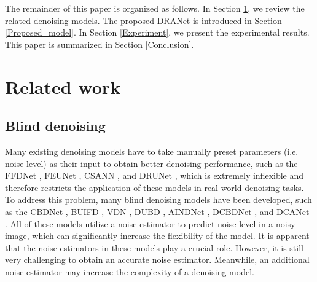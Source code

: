 \documentclass[3p,times]{elsarticle}
\begin{document}
The remainder of this paper is organized as follows. In Section \ref{Related_work}, we review the related denoising models. The proposed DRANet is introduced in Section \ref{Proposed_model}. In Section \ref{Experiment}, we present the experimental results. This paper is summarized in Section \ref{Conclusion}.

\section{Related work}\label{Related_work}

\subsection{Blind denoising}
Many existing denoising models have to take manually preset parameters (i.e. noise level) as their input to obtain better denoising performance, such as the FFDNet \cite{Zhang2018}, FEUNet \cite{Wu2023}, CSANN \cite{Wang2021}, and DRUNet \cite{Zhang2022}, which is extremely inflexible and therefore restricts the application of these models in real-world denoising tasks. To address this problem, many blind denoising models have been developed, such as the CBDNet \cite{Guo2019}, BUIFD \cite{Helou2020}, VDN \cite{Yue2019}, DUBD \cite{Soh2020}, AINDNet \cite{Kim2020}, DCBDNet \cite{WuS2023}, and DCANet \cite{WuG2023}. All of these models utilize a noise estimator to predict noise level in a noisy image, which can significantly increase the flexibility of the model. It is apparent that the noise estimators in these models play a crucial role. However, it is still very challenging to obtain an accurate noise estimator. Meanwhile, an additional noise estimator may increase the complexity of a denoising model.
\end{document}

